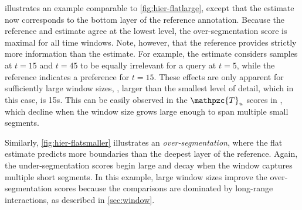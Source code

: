 \documentclass{article}
\def\shag{\ensuremath{\mathpzc{T}}}
\begin{document}
 illustrates an example comparable to \cref{fig:hier-flatlarge}, except that the
estimate now corresponds to the bottom layer of the reference annotation.
Because the reference and estimate agree at the lowest level, the over-segmentation score is maximal for all time windows.
Note, however, that the reference provides strictly more information than the estimate.  For example, the estimate considers samples at $t=15$ and $t=45$ to be equally irrelevant for a 
query at $t=5$, while the reference indicates a preference for $t=15$.  These effects are only apparent for sufficiently large window sizes, \eg, larger than the smallest level of
detail, which in this case, is 15s.  This can be easily observed in the $\shag_u$
scores in , which decline when the window size grows
large enough to span multiple small segments.

Similarly, \cref{fig:hier-flatsmaller} illustrates an \emph{over-segmentation}, where the flat estimate
predicts more boundaries than the deepest layer of the reference.  Again, the under-segmentation scores begin
large and decay when the window captures multiple short segments.  In this example, large window sizes
improve the over-segmentation scores because the comparisons are dominated by long-range interactions, as
described in \cref{sec:window}.
\end{document}
